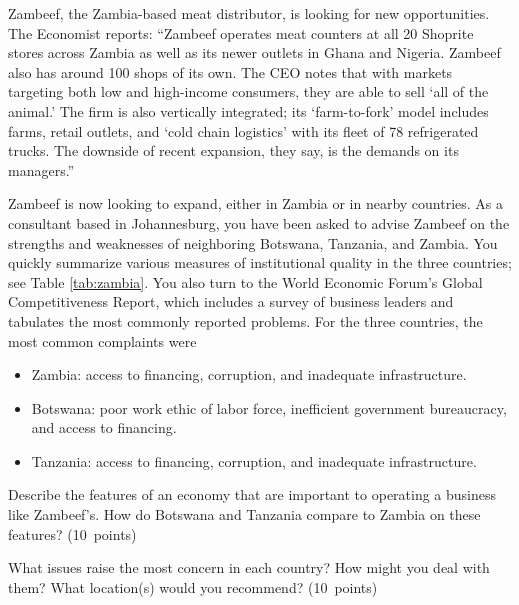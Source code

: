 \documentclass[letterpaper,12pt]{exam}
\begin{document}
\begin{questions}
Zambeef, the Zambia-based meat distributor, is looking for new opportunities.
The Economist reports:
``Zambeef operates meat counters at all 20 Shoprite stores across Zambia
as well as its newer outlets in Ghana and Nigeria.
Zambeef also has around 100 shops of its own.
The CEO notes that with markets targeting both low and high-income consumers,
they are able to sell `all of the animal.'
The firm is also vertically integrated;
its `farm-to-fork' model includes farms, retail outlets,
and `cold chain logistics' with its fleet of 78 refrigerated trucks.
The downside of recent expansion, they say, is the demands on its managers.''

Zambeef is now looking to expand, either in Zambia or in nearby countries.
As a consultant based in Johannesburg,
you have been asked to advise Zambeef on the strengths and weaknesses
of neighboring Botswana, Tanzania, and Zambia.
You quickly summarize various measures of institutional quality in the three countries;
see Table \ref{tab:zambia}.
You also turn to the World Economic Forum's Global Competitiveness Report,
which includes a survey of business leaders and tabulates the most commonly
reported problems.
For the three countries, the most common complaints were
\begin{itemize}
\item Zambia:  access to financing, corruption, and inadequate infrastructure.
\item Botswana:  poor work ethic of labor force, inefficient government bureaucracy,
and access to financing.
\item Tanzania:  access to financing, corruption, and inadequate infrastructure.
\end{itemize}


\begin{parts}
\item Describe the features of an economy that are important to
operating a business like Zambeef's.
How do Botswana and Tanzania compare to Zambia on these features?
(10~points)
\item
What issues raise the most concern in each country?
How might you deal with them?
What location(s) would you recommend?
(10~points)
\end{parts}


\end{questions}
\end{document}
